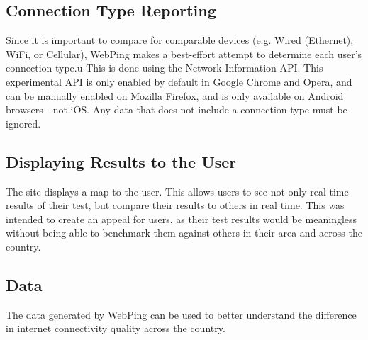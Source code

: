 \subsection{Connection Type Reporting}
Since it is important to compare \rtts for comparable devices (e.g. Wired (Ethernet), WiFi, or Cellular), WebPing makes a best-effort attempt to determine each user's connection type.u This is done using the Network Information API. This experimental API is only enabled by default in Google Chrome and Opera, and can be manually enabled on Mozilla Firefox, and is only available on Android browsers - not iOS. Any data that does not include a connection type must be ignored.

\subsection{Displaying Results to the User}
The site displays a map to the user. This allows users to see not only real-time results of their test, but compare their results to others in real time. This was intended to create an appeal for users, as their test results would be meaningless without being able to benchmark them against others in their area and across the country.

\subsection{Data}
The data generated by WebPing can be used to better understand the difference in internet connectivity quality across the country.

    
    
    